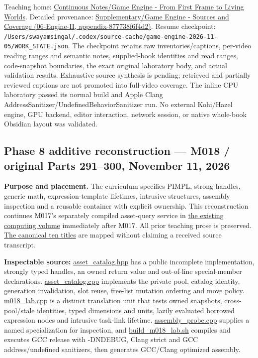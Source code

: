 Teaching home: \href{Continuous\%20Notes/Game\%20Engine\%20-\%20From\%20First\%20Frame\%20to\%20Living\%20Worlds}{Continuous Notes/Game Engine - From First Frame to Living Worlds}. Detailed provenance: \href{../06-Engine-II/main.pdf\#nameddest=appendix-877738f6f4d2}{Supplementary/Game Engine - Sources and Coverage (06-Engine-II, appendix-877738f6f4d2)}. Resume checkpoint: \texttt{/Users/swayamsingal/.codex/source-cache/game-engine-2026-11-05/WORK\_STATE.json}. The checkpoint retains raw inventories/captions, per-video reading ranges and semantic notes, supplied-book identities and read ranges, code-snapshot boundaries, the exact original laboratory body, and actual validation results. Exhaustive source synthesis is pending; retrieved and partially reviewed captions are not promoted into full-video coverage. The inline CPU laboratory passed its normal build and Apple Clang AddressSanitizer/UndefinedBehaviorSanitizer run. No external Kohi/Hazel engine, GPU backend, editor interaction, network session, or native whole-book Obsidian layout was validated.

\subsection{Phase 8 additive reconstruction --- M018 / original Parts 291--300, November 11, 2026}\label{appendix-a103e7846d21-phase-8-additive-reconstruction-m018-original-parts-291300-november-11-2026}

\textbf{Purpose and placement.} The curriculum specifies PIMPL, strong handles, generic math, expression-template lifetimes, intrusive structures, assembly inspection and a reusable container with explicit ownership. This reconstruction continues M017's separately compiled asset-query service in \hyperref[01-foundations-i-ch007-a-registry-crosses-its-last-c-boundary-hidden-implementation-typed-identity-and-measured-abstraction-cost]{the existing computing volume} immediately after M017. All prior teaching prose is preserved. \hyperref[appendix-fd090d982a15-m018-parts-291300-the-same-asset-service-becomes-a-typed-hidden-and-measurable-engine-api]{The canonical ten titles} are mapped without claiming a received source transcript.

\textbf{Inspectable source:} \hyperref[source-file-0529c78555b675a2ae111228]{asset\_catalog.hpp} has a public incomplete implementation, strongly typed handles, an owned return value and out-of-line special-member declarations. \hyperref[source-file-04abded74b7e03edc5dcf870]{asset\_catalog.cpp} implements the private pool, catalog identity, generation invalidation, slot reuse, free-list mutation ordering and move policy. \hyperref[source-file-8aedc3fdcd10c91971507448]{m018\_lab.cpp} is a distinct translation unit that tests owned snapshots, cross-pool/stale identities, typed dimensions and units, lazily evaluated borrowed expression nodes and intrusive task-link lifetime. \hyperref[source-file-eab7d4e282f0926fda89ab31]{assembly\_probe.cpp} supplies a named specialization for inspection, and \hyperref[source-file-c936569afa19be638ec87991]{build\_m018\_lab.sh} compiles and executes GCC release with -DNDEBUG, Clang strict and GCC address/undefined sanitizers, then generates GCC/Clang optimized assembly.

